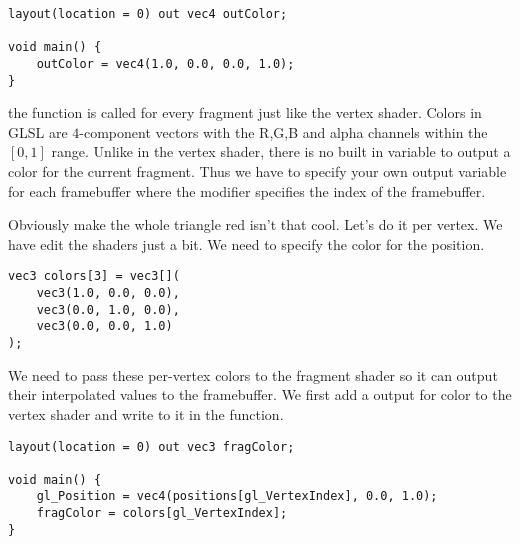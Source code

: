 \begin{center}
\begin{minipage}{0.95\linewidth}
\begin{lstlisting}
layout(location = 0) out vec4 outColor;

void main() {
    outColor = vec4(1.0, 0.0, 0.0, 1.0);
}
\end{lstlisting}
\end{minipage}
\end{center}

\par the  function is called for every fragment just like the vertex shader. Colors in GLSL are $4$-component vectors with the R,G,B and alpha channels within the  $\left[ 0,1 \right] $ range. Unlike  in the vertex shader, there is no built in variable to output a color for the current fragment. Thus we have to specify your own output variable for each framebuffer where the  modifier specifies the index of the framebuffer.

\par Obviously make the whole triangle red isn't that cool. Let's do it per vertex. We have edit the shaders just a bit. We need to specify the color for the position.

\begin{center}
\begin{minipage}{0.95\linewidth}
\begin{lstlisting}
vec3 colors[3] = vec3[](
    vec3(1.0, 0.0, 0.0),
    vec3(0.0, 1.0, 0.0),
    vec3(0.0, 0.0, 1.0)
);
\end{lstlisting}
\end{minipage}
\end{center}

\par We need to pass these per-vertex colors to the fragment shader so it can output their interpolated values to the framebuffer. We first add a output for color to the vertex shader and write to it in the  function.

\begin{center}
\begin{minipage}{0.95\linewidth}
\begin{lstlisting}
layout(location = 0) out vec3 fragColor;

void main() {
    gl_Position = vec4(positions[gl_VertexIndex], 0.0, 1.0);
    fragColor = colors[gl_VertexIndex];
}
\end{lstlisting}
\end{minipage}
\end{center}

